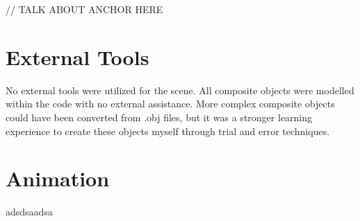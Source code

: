 \documentclass[]{article}
\begin{document}
// TALK ABOUT ANCHOR HERE

\section*{External Tools}

No external tools were utilized for the scene. All composite objects were modelled within the code with no external assistance. More complex composite objects could have been converted from .obj files, but it was a stronger learning experience to create these objects myself through trial and error techniques.


\section*{Animation}
adsdsaadsa


\break
\setlength{}
\printbibliography

\end{document}
